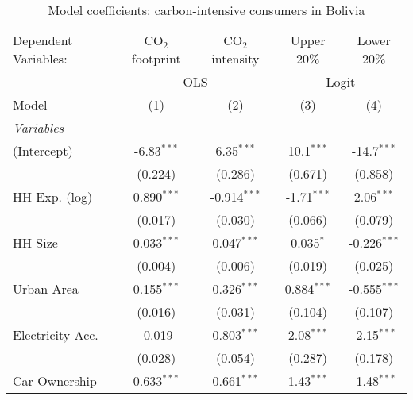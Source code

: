 
\begin{table}[htbp!]
   \centering
   \small
   \begin{adjustbox}{width = 1\textwidth, max height = 0.95\textheight, center}
      \begin{threeparttable}[b]
         \caption{\label{tab:Logit_1_BOL} Model coefficients: carbon-intensive consumers in Bolivia}
         \begin{tabular}{lcccc}
            \tabularnewline \midrule \midrule
            Dependent Variables: & CO$_{2}$ footprint & CO$_{2}$ intensity & Upper 20\%    & Lower 20\%\\   
             & \multicolumn{2}{c}{OLS} & \multicolumn{2}{c}{Logit} \\ 
            Model                & (1)                & (2)                & (3)           & (4)\\  
            \midrule
            \emph{Variables}\\
            (Intercept)          & -6.83$^{***}$      & 6.35$^{***}$       & 10.1$^{***}$  & -14.7$^{***}$\\   
                                 & (0.224)            & (0.286)            & (0.671)       & (0.858)\\   
            HH Exp. (log)        & 0.890$^{***}$      & -0.914$^{***}$     & -1.71$^{***}$ & 2.06$^{***}$\\   
                                 & (0.017)            & (0.030)            & (0.066)       & (0.079)\\   
            HH Size              & 0.033$^{***}$      & 0.047$^{***}$      & 0.035$^{*}$   & -0.226$^{***}$\\   
                                 & (0.004)            & (0.006)            & (0.019)       & (0.025)\\   
            Urban Area           & 0.155$^{***}$      & 0.326$^{***}$      & 0.884$^{***}$ & -0.555$^{***}$\\   
                                 & (0.016)            & (0.031)            & (0.104)       & (0.107)\\   
            Electricity Acc.     & -0.019             & 0.803$^{***}$      & 2.08$^{***}$  & -2.15$^{***}$\\   
                                 & (0.028)            & (0.054)            & (0.287)       & (0.178)\\   
            Car Ownership        & 0.633$^{***}$      & 0.661$^{***}$      & 1.43$^{***}$  & -1.48$^{***}$\\   

\end{tabular}
\end{threeparttable}
\end{adjustbox}
\end{table}
